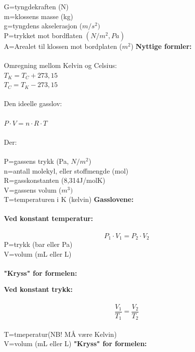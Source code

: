 \documentclass[12pt,a4paper]{article}
\begin{document}
G=tyngdekraften (N)\\
m=klossens masse (kg)\\
g=tyngdens akselerasjon ($m/s^2)$\\
P=trykket mot bordflaten $(N/m^2, Pa)$\\
A=Arealet til klossen mot bordplaten ($m^2$)\newpage
\noindent\large\textbf{Nyttige formler:}\\\\
Omregning mellom Kelvin og Celsius:\\
$T_K=T_C+273,15$\\
$T_C=T_K-273,15$\\\\
Den ideelle gasslov:\\\\
$P\cdot V=n\cdot R\cdot T$\\\\
Der:\\\\
P=gassens trykk (Pa, $N/m^2$)\\
n=antall molekyl, eller stoffmengde (mol)\\
R=gasskonstanten (8,314J/molK)\\
V=gassens volum ($m^3)$\\
T=temperaturen i K (kelvin)\newpage
\noindent\large\textbf{Gasslovene:}\\\\
\textbf{Ved konstant temperatur:}\\\\
$$P_1\cdot V_1=P_2\cdot V_2$$
P=trykk (bar eller Pa)\\
V=volum (mL eller L)\\\\
\textbf{"Kryss" for formelen:}\vspace{1cm}
\begin{center}
\end{center}
\textbf{Ved konstant trykk:}\\\\
$$\frac{V_1}{T_1}=\frac{V_2}{T_2}$$\\
T=tmeperatur(NB! MÅ være Kelvin)\\
V=volum (mL eller L)\newpage
\textbf{"Kryss" for formelen:}\vspace{1cm}
\end{document}
